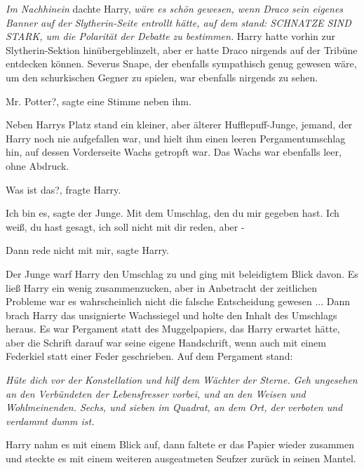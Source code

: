 \emph{Im Nachhinein} dachte Harry, \emph{wäre es schön gewesen, wenn Draco sein
eigenes Banner auf der Slytherin-Seite entrollt hätte, auf dem stand: \glqq{}
SCHNATZE SIND STARK\grqq{}, um die Polarität der Debatte zu bestimmen.} Harry
hatte vorhin zur Slytherin-Sektion hinübergeblinzelt, aber er hatte Draco
nirgends auf der Tribüne entdecken können. Severus Snape, der ebenfalls
sympathisch genug gewesen wäre, um den schurkischen Gegner zu spielen, war
ebenfalls nirgends zu sehen.

\glqq{}Mr. Potter?\grqq{}, sagte eine Stimme neben ihm.

Neben Harrys Platz stand ein kleiner, aber älterer Hufflepuff-Junge, jemand, der
Harry noch nie aufgefallen war, und hielt ihm einen leeren Pergamentumschlag
hin, auf dessen Vorderseite Wachs getropft war. Das Wachs war ebenfalls leer,
ohne Abdruck.

\glqq{}Was ist das?\grqq{}, fragte Harry.

\glqq{}Ich bin es\grqq{}, sagte der Junge. \glqq{}Mit dem Umschlag, den du mir
gegeben hast. Ich weiß, du hast gesagt, ich soll nicht mit dir reden, aber -\grqq{}

\glqq{}Dann rede nicht mit mir\grqq{}, sagte Harry.

Der Junge warf Harry den Umschlag zu und ging mit beleidigtem Blick davon. Es
ließ Harry ein wenig zusammenzucken, aber in Anbetracht der zeitlichen Probleme
war es wahrscheinlich nicht die falsche Entscheidung gewesen ... Dann brach Harry
das unsignierte Wachssiegel und holte den Inhalt des Umschlags heraus. Es war
Pergament statt des Muggelpapiers, das Harry erwartet hätte, aber die Schrift
darauf war seine eigene Handschrift, wenn auch mit einem Federkiel statt einer
Feder geschrieben. Auf dem Pergament stand:

\emph{Hüte dich vor der Konstellation und hilf dem Wächter der Sterne.}
\emph{Geh ungesehen an den Verbündeten der Lebensfresser vorbei, und an den
Weisen und Wohlmeinenden. Sechs, und sieben im Quadrat, an dem Ort, der verboten
und verdammt dumm ist.}

Harry nahm es mit einem Blick auf, dann faltete er das Papier wieder zusammen
und steckte es mit einem weiteren ausgeatmeten Seufzer zurück in seinen Mantel.

